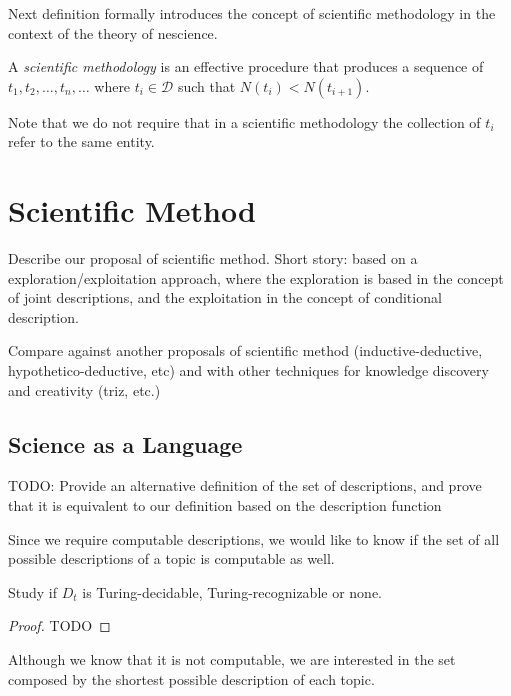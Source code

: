 Next definition formally introduces the concept of scientific methodology in the context of the theory of nescience.

\begin{definition}
A \emph{scientific methodology} is an effective procedure that produces a sequence of $t_1, t_2, \ldots, t_n, \ldots$ where $t_i \in \mathcal{D}$ such that $N(t_i) < N(t_{i+1})$.
\end{definition}

Note that we do not require that in a scientific methodology the collection of $t_i$ refer to the same entity.

%
%

\section{Scientific Method}

{\color{red} Describe our proposal of scientific method. Short story: based on a exploration/exploitation approach, where the exploration is based in the concept of joint descriptions, and the exploitation in the concept of conditional description.}

{\color{red} Compare against another proposals of scientific method (inductive-deductive, hypothetico-deductive, etc) and with other techniques for knowledge discovery and creativity (triz, etc.)}

\subsection{Science as a Language}

{\color{red} TODO: Provide an alternative definition of the set of descriptions, and prove that it is equivalent to our definition based on the description function}

Since we require computable descriptions, we would like to know if the set of all possible descriptions of a topic is computable as well.

\begin{proposition}
Study if $D_{t}$ is Turing-decidable, Turing-recognizable or none.
\end{proposition}
\begin{proof}
{\color{red} TODO}
\end{proof}

Although we know that it is not computable, we are interested in the set composed by the shortest possible description of each topic.


